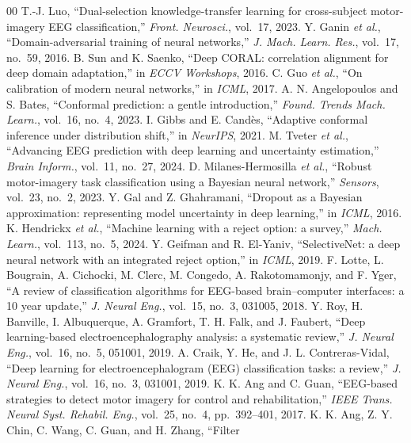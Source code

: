 \documentclass[conference]{IEEEtran}
\begin{document}
\begin{thebibliography}{00}
 T.-J. Luo, ``Dual-selection knowledge-transfer learning for
cross-subject motor-imagery EEG classification,'' \emph{Front. Neurosci.}, vol.~17,
2023.
 Y. Ganin \emph{et al.}, ``Domain-adversarial training of neural
networks,'' \emph{J. Mach. Learn. Res.}, vol.~17, no.~59, 2016.
 B. Sun and K. Saenko, ``Deep CORAL: correlation alignment for deep
domain adaptation,'' in \emph{ECCV Workshops}, 2016.
 C. Guo \emph{et al.}, ``On calibration of modern neural networks,''
in \emph{ICML}, 2017.
 A. N. Angelopoulos and S. Bates, ``Conformal prediction:
a gentle introduction,'' \emph{Found. Trends Mach. Learn.}, vol.~16, no.~4, 2023.
 I. Gibbs and E. Cand\`es, ``Adaptive conformal inference under
distribution shift,'' in \emph{NeurIPS}, 2021.
 M. Tveter \emph{et al.}, ``Advancing EEG prediction with deep
learning and uncertainty estimation,'' \emph{Brain Inform.}, vol.~11, no.~27, 2024.
 D. Milanes-Hermosilla \emph{et al.}, ``Robust motor-imagery
task classification using a Bayesian neural network,'' \emph{Sensors}, vol.~23,
no.~2, 2023.
 Y. Gal and Z. Ghahramani, ``Dropout as a Bayesian approximation:
representing model uncertainty in deep learning,'' in \emph{ICML}, 2016.
 K. Hendrickx \emph{et al.}, ``Machine learning with a reject
option: a survey,'' \emph{Mach. Learn.}, vol.~113, no.~5, 2024.
 Y. Geifman and R. El-Yaniv, ``SelectiveNet: a deep neural
network with an integrated reject option,'' in \emph{ICML}, 2019.
 F. Lotte, L. Bougrain, A. Cichocki, M. Clerc, M. Congedo,
A. Rakotomamonjy, and F. Yger, ``A review of classification algorithms for
EEG-based brain--computer interfaces: a 10 year update,'' \emph{J. Neural Eng.},
vol.~15, no.~3, 031005, 2018.
 Y. Roy, H. Banville, I. Albuquerque, A. Gramfort, T. H. Falk, and
J. Faubert, ``Deep learning-based electroencephalography analysis: a systematic
review,'' \emph{J. Neural Eng.}, vol.~16, no.~5, 051001, 2019.
 A. Craik, Y. He, and J. L. Contreras-Vidal, ``Deep learning for
electroencephalogram (EEG) classification tasks: a review,'' \emph{J. Neural Eng.},
vol.~16, no.~3, 031001, 2019.
 K. K. Ang and C. Guan, ``EEG-based strategies to detect motor
imagery for control and rehabilitation,'' \emph{IEEE Trans. Neural Syst. Rehabil.
Eng.}, vol.~25, no.~4, pp.~392--401, 2017.
 K. K. Ang, Z. Y. Chin, C. Wang, C. Guan, and H. Zhang, ``Filter

\end{thebibliography}
\end{document}
